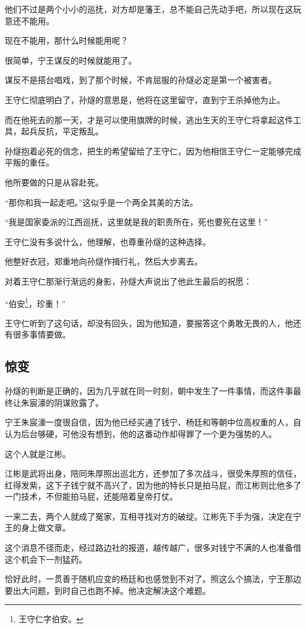 \begin{multicols}{\theparacolNo}
他们不过是两个小小的巡抚，对方却是藩王，总不能自己先动手吧，所以现在这玩意还不能用。

现在不能用，那什么时候能用呢？

很简单，宁王谋反的时候就能用了。

谋反不是搭台唱戏，到了那个时候，不肯屈服的孙燧必定是第一个被害者。

王守仁彻底明白了，孙燧的意思是，他将在这里留守，直到宁王杀掉他为止。

而在他死去的那一天，才是可以使用旗牌的时候，逃出生天的王守仁将拿起这件工具，起兵反抗，平定叛乱。

孙燧抱着必死的信念，把生的希望留给了王守仁，因为他相信王守仁一定能够完成平叛的重任。

他所要做的只是从容赴死。

“那你和我一起走吧。”这似乎是一个两全其美的方法。

“我是国家委派的江西巡抚，这里就是我的职责所在，死也要死在这里！”

王守仁没有多说什么，他理解，也尊重孙燧的这种选择。

他整好衣冠，郑重地向孙燧作揖行礼，然后大步离去。

对着王守仁那渐行渐远的身影，孙燧大声说出了他此生最后的祝愿：

“伯安\footnote{王守仁字伯安。}，珍重！”

王守仁听到了这句话，却没有回头，因为他知道，要报答这个勇敢无畏的人，他还有很多事情要做。

\subsection{惊变}
孙燧的判断是正确的，因为几乎就在同一时刻，朝中发生了一件事情，而这件事最终让朱宸濠的阴谋败露了。

宁王朱宸濠一度很自信，因为他已经买通了钱宁、杨廷和等朝中位高权重的人，自认为后台够硬，可他没有想到，他的这番动作却得罪了一个更为强势的人。

这个人就是江彬。

江彬是武将出身，陪同朱厚照出巡北方，还参加了多次战斗，很受朱厚照的信任，红得发紫，这下子钱宁就不高兴了，因为他的特长只是拍马屁，而江彬则比他多了一门技术，不但能拍马屁，还能陪着皇帝打仗。

一来二去，两个人就成了冤家，互相寻找对方的破绽。江彬先下手为强，决定在宁王的身上做文章。

这个消息不径而走，经过路边社的报道，越传越广，很多对钱宁不满的人也准备借这个机会下一剂猛药。

恰好此时，一贯善于随机应变的杨廷和也感觉到不对了。照这么个搞法，宁王那边要出大问题，到时自己也跑不掉。他决定解决这个难题。


\end{multicols}
